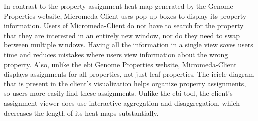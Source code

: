 In contrast to the property assignment heat map generated by the Genome 
Properties website, Micromeda-Client uses pop-up boxes to display its property 
information. Users of Micromeda-Client do not have to search for the property 
that they are interested in an entirely new window, nor do they need to swap 
between multiple windows. Having all the information in a single view saves 
users time and reduces mistakes where users view information about the wrong 
property. Also, unlike the \gls{ebi} Genome Properties website, Micromeda-Client 
displays assignments for all properties, not just leaf properties. The icicle 
diagram that is present in the client's visualization helps organize property 
assignments, so users more easily find these assignments. Unlike the \gls{ebi} tool, the 
client's assignment viewer does use interactive aggregation and disaggregation, 
which decreases the length of its heat maps substantially.

